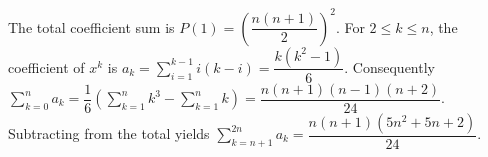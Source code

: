 The total coefficient sum is $P(1)=\left(\dfrac{n(n+1)}{2}\right)^2$. For $2\le k\le n$, the coefficient of $x^k$ is $a_k=\sum_{i=1}^{k-1}i(k-i)=\dfrac{k(k^2-1)}{6}$. Consequently $\sum_{k=0}^{n}a_k=\dfrac{1}{6}\left(\sum_{k=1}^n k^3-\sum_{k=1}^n k\right)=\dfrac{n(n+1)(n-1)(n+2)}{24}$. Subtracting from the total yields $\boxed{\sum_{k=n+1}^{2n}a_k=\dfrac{n(n+1)(5n^2+5n+2)}{24}}$.
